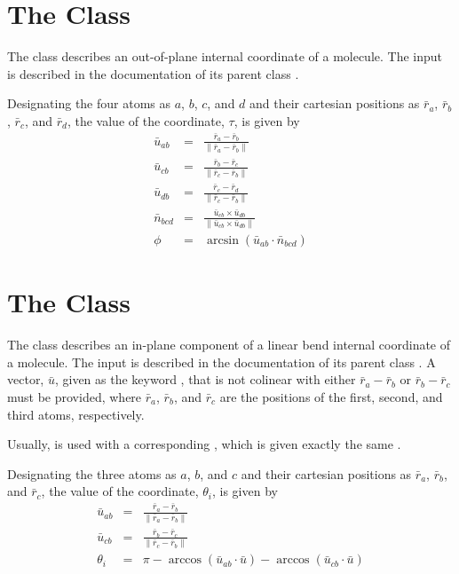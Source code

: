 \section{The  Class}\label{OutSimpleCo}

The  class describes an out-of-plane internal coordinate
of a molecule.  The input is described in the documentation of its parent
class .

Designating the four atoms as $a$, $b$, $c$, and $d$ and their cartesian
positions as $\bar{r}_a$, $\bar{r}_b$, $\bar{r}_c$, and $\bar{r}_d$, the
value of the coordinate, $\tau$, is given by
\begin{eqnarray*}
 \bar{u}_{ab} &=& \frac{\bar{r}_a - \bar{r}_b}{\| \bar{r}_a - \bar{r}_b \|}\\
 \bar{u}_{cb} &=& \frac{\bar{r}_b - \bar{r}_c}{\| \bar{r}_c - \bar{r}_b \|}\\
 \bar{u}_{db} &=& \frac{\bar{r}_c - \bar{r}_d}{\| \bar{r}_c - \bar{r}_b \|}\\
 \bar{n}_{bcd}&=& \frac{\bar{u}_{cb} \times \bar{u}_{db}}
                       {\| \bar{u}_{cb} \times \bar{u}_{db} \|} \\
 \phi       &=& \arcsin ( \bar{u}_{ab} \cdot \bar{n}_{bcd} )
\end{eqnarray*}


\section{The  Class}\label{LinIPSimpleCo}

The  class describes an in-plane component of a linear
bend internal coordinate of a molecule.  The input is described in the
documentation of its parent class .  A vector,
$\bar{u}$, given as the keyword , that is not colinear with either
$\bar{r}_a - \bar{r}_b$ or $\bar{r}_b - \bar{r}_c$ must be provided, where
$\bar{r}_a$, $\bar{r}_b$, and $\bar{r}_c$ are the positions of the first,
second, and third atoms, respectively.

  Usually,  is used with a corresponding
, which is given exactly the same .

Designating the three atoms as $a$, $b$, and $c$ and their cartesian
positions as $\bar{r}_a$, $\bar{r}_b$, and $\bar{r}_c$, the value of the
coordinate, $\theta_i$, is given by
\begin{eqnarray*}
 \bar{u}_{ab} &=& \frac{\bar{r}_a - \bar{r}_b}{\| \bar{r}_a - \bar{r}_b \|}\\
 \bar{u}_{cb} &=& \frac{\bar{r}_b - \bar{r}_c}{\| \bar{r}_c - \bar{r}_b \|}\\
 \theta_i     &=& \pi - \arccos ( \bar{u}_{ab} \cdot \bar{u} )
                      - \arccos ( \bar{u}_{cb} \cdot \bar{u} )
\end{eqnarray*}

